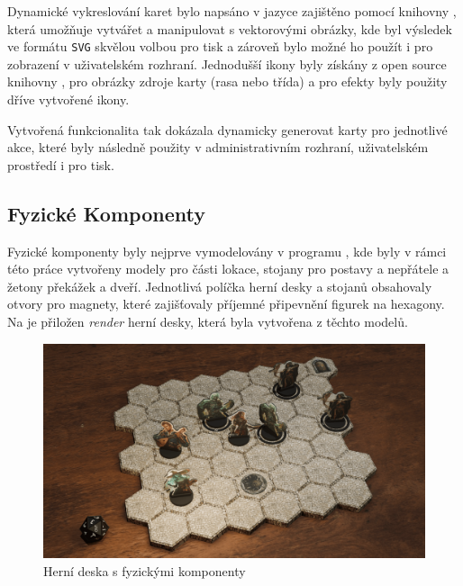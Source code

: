 Dynamické vykreslování karet bylo napsáno v jazyce  zajištěno pomocí knihovny , která umožňuje vytvářet a manipulovat s vektorovými obrázky, kde byl výsledek ve formátu \texttt{SVG} skvělou volbou pro tisk a zároveň bylo možné ho použít i pro zobrazení v uživatelském rozhraní. Jednodušší ikony byly získány z open source knihovny , pro obrázky zdroje karty (rasa nebo třída) a pro efekty byly použity dříve vytvořené ikony.

Vytvořená funkcionalita tak dokázala dynamicky generovat karty pro jednotlivé akce, které byly následně použity v administrativním rozhraní, uživatelském prostředí i pro tisk.

\subsection{Fyzické Komponenty}
\label{subsec:physical_components}

Fyzické komponenty byly nejprve vymodelovány v programu , kde byly v rámci této práce vytvořeny modely pro části lokace, stojany pro postavy a nepřátele a žetony překážek a dveří. Jednotlivá políčka herní desky a stojanů obsahovaly otvory pro magnety, které zajišťovaly příjemné připevnění figurek na hexagony. Na  je přiložen \textit{render} herní desky, která byla vytvořena z těchto modelů.

\begin{figure}[h]
    \centering
    \includegraphics[width=\textwidth]{figures/images/game.png}
    \caption{Herní deska s fyzickými komponenty}
    \label{fig:game_board}
\end{figure}

